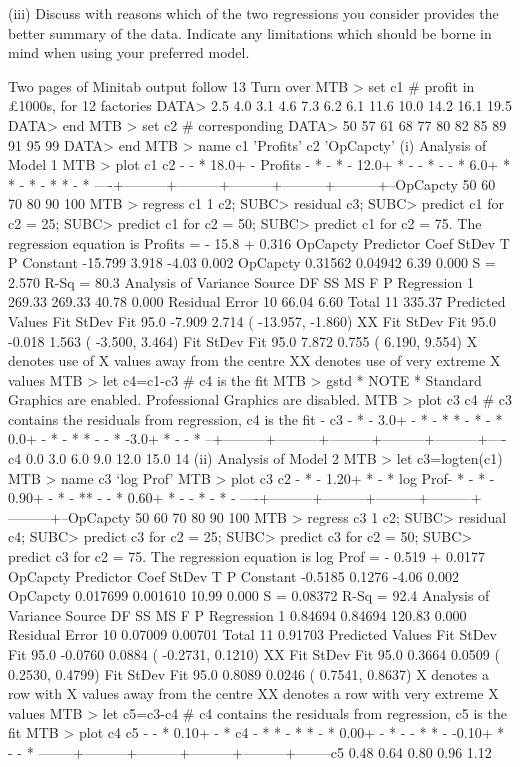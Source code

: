\documentclass[a4paper,12pt]{article}
\begin{document}
\begin{framed}
(iii) Discuss with reasons which of the two regressions you consider provides
the better summary of the data. Indicate any limitations which should be
borne in mind when using your preferred model.

Two pages of Minitab output follow
13 Turn over
MTB > set c1 # profit in £1000s, for 12 factories
DATA> 2.5 4.0 3.1 4.6 7.3 6.2 6.1 11.6 10.0 14.2 16.1 19.5 DATA> end
MTB > set c2 # corresponding %
DATA> 50 57 61 68 77 80 82 85 89 91 95 99 DATA> end
MTB > name c1 'Profits' c2 'OpCapcty'
(i) Analysis of Model 1
MTB > plot c1 c2
-
- *
18.0+
-
Profits - *
- *
-
12.0+ *
-
- *
-
- *
6.0+ * *
- *
- * *
- *
----+---------+---------+---------+---------+---------+--OpCapcty
50 60 70 80 90 100
MTB > regress c1 1 c2;
SUBC> residual c3;
SUBC> predict c1 for c2 = 25; SUBC> predict c1 for c2 = 50; SUBC> predict c1 for c2 = 75.
The regression equation is Profits = - 15.8 + 0.316 OpCapcty
Predictor Coef StDev T P
Constant -15.799 3.918 -4.03 0.002
OpCapcty 0.31562 0.04942 6.39 0.000
S = 2.570 R-Sq = 80.3%
Analysis of Variance
Source DF SS MS F P
Regression 1 269.33 269.33 40.78 0.000
Residual Error 10 66.04 6.60
Total 11 335.37
Predicted Values
Fit StDev Fit 95.0%
-7.909 2.714 ( -13.957, -1.860) XX
Fit StDev Fit 95.0%
-0.018 1.563 ( -3.500, 3.464)
Fit StDev Fit 95.0%
7.872 0.755 ( 6.190, 9.554)
X denotes use of X values away from the centre
XX denotes use of very extreme X values
MTB > let c4=c1-c3 # c4 is the fit
MTB > gstd
* NOTE * Standard Graphics are enabled. Professional Graphics are disabled.
MTB > plot c3 c4 # c3 contains the residuals from regression, c4 is the fit
-
c3 - *
-
3.0+
- *
- * *
- *
- *
0.0+
- *
- * *
-
- *
-3.0+ *
-
- *
--+---------+---------+---------+---------+---------+----c4
0.0 3.0 6.0 9.0 12.0 15.0
14
(ii) Analysis of Model 2
MTB > let c3=logten(c1)
MTB > name c3 ‘log Prof’
MTB > plot c3 c2
- *
-
1.20+ *
- *
log Prof- *
- *
-
0.90+
- *
- **
-
- *
0.60+ *
-
- *
- *
-
----+---------+---------+---------+---------+---------+--OpCapcty
50 60 70 80 90 100
MTB > regress c3 1 c2;
SUBC> residual c4;
SUBC> predict c3 for c2 = 25; SUBC> predict c3 for c2 = 50; SUBC> predict c3 for c2 = 75.
The regression equation is log Prof = - 0.519 + 0.0177 OpCapcty
Predictor Coef StDev T P
Constant -0.5185 0.1276 -4.06 0.002
OpCapcty 0.017699 0.001610 10.99 0.000
S = 0.08372 R-Sq = 92.4%
Analysis of Variance
Source DF SS MS F P
Regression 1 0.84694 0.84694 120.83 0.000
Residual Error 10 0.07009 0.00701
Total 11 0.91703
Predicted Values
Fit StDev Fit 95.0%
-0.0760 0.0884 ( -0.2731, 0.1210) XX
Fit StDev Fit 95.0%
0.3664 0.0509 ( 0.2530, 0.4799)
Fit StDev Fit 95.0%
0.8089 0.0246 ( 0.7541, 0.8637)
X denotes a row with X values away from the centre
XX denotes a row with very extreme X values
MTB > let c5=c3-c4 # c4 contains the residuals from regression, c5 is the fit
MTB > plot c4 c5
-
- *
0.10+
- *
c4 - * *
- * *
- *
0.00+
- *
-
- * *
-
-0.10+ *
-
- *
--------+---------+---------+---------+---------+--------c5
0.48 0.64 0.80 0.96 1.12



\end{framed}
\end{document}
